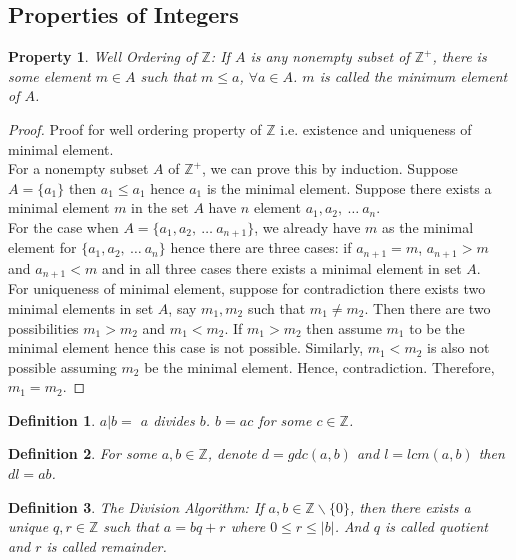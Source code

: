\documentclass[12pt]{report}
\newtheorem{defn}{Definition}
\newtheorem{proper}{Property}
\begin{document}
\subsection*{Properties of Integers}
\begin{proper}
    Well Ordering of $\mathbb{Z}$: If $A$ is any nonempty subset of $\mathbb{Z^+}$, there is some element $m \in A$ such that $m \leq a$, $\forall a \in A$. $m$ is called the minimum element of $A$. 
\end{proper}
\begin{proof}
    Proof for well ordering property of $\mathbb{Z}$ i.e. existence and uniqueness of minimal element.\\
    For a nonempty subset $A$ of $\mathbb{Z^+}$, we can prove this by induction. Suppose $A = \{a_1\}$ then $a_1 \leq a_1$ hence $a_1$ is the minimal element. Suppose there exists a minimal element $m$ in the set $A$ have $n$ element $a_1, a_2 ,~\dots~ a_n$. \\
    For the case when $A = \{a_1, a_2, ~\dots~a_{n+1}\}$, we already have $m$ as the minimal element for $\{a_1, a_2,~\dots~a_n\}$ hence there are three cases: if $a_{n+1} = m$, $a_{n+1} > m$ and $a_{n+1} < m$ and in all three cases there exists a minimal element in set $A$.\\
    For uniqueness of minimal element, suppose for contradiction there exists two minimal elements in set $A$, say $m_1, m_2$ such that $m_1 \neq m_2$. Then there are two possibilities $m_1 > m_2$ and $m_1 < m_2$. If $m_1 > m_2$ then assume $m_1$ to be the minimal element hence this case is not possible. Similarly, $m_1 < m_2$ is also not possible assuming $m_2$ be the minimal element. Hence, contradiction. Therefore, $m_1 = m_2$. 
\end{proof}
\begin{defn}
    $ a | b =$ $a$ divides $b$. $b = ac$ for some $c \in \mathbb{Z}$.
\end{defn}
\begin{defn}
    For some $a, b \in \mathbb{Z}$, denote $d = gdc(a,b)$ and $l = lcm(a,b)$ then $dl = ab$.
\end{defn}
\begin{defn}
    The Division Algorithm: If $a,b \in \mathbb{Z} \backslash \{0\}$, then there exists a unique $q,r \in \mathbb{Z}$ such that $a = bq +r$ where $0 \leq r \leq |b|$. And $q$ is called quotient and $r$ is called remainder.
\end{defn}
\end{document}
